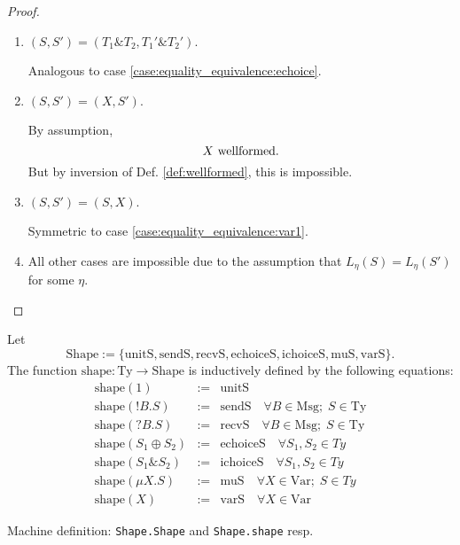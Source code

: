 \documentclass{llncs}
\newcommand*{\Msg}{\mathrm{Msg}}
\newcommand*{\Var}{\mathrm{Var}}
\newcommand*{\Ty}{\mathrm{Ty}}
\newcommand*{\Shape}{\mathrm{Shape}}
\newcommand*{\shape}{\mathrm{shape}}
\newcommand*{\unitS}{\mathrm{unitS}}
\newcommand*{\sendS}{\mathrm{sendS}}
\newcommand*{\recvS}{\mathrm{recvS}}
\newcommand*{\echoiceS}{\mathrm{echoiceS}}
\newcommand*{\ichoiceS}{\mathrm{ichoiceS}}
\newcommand*{\muS}{\mathrm{muS}}
\newcommand*{\varS}{\mathrm{varS}}
\newcommand*{\send}{\mathord{!}}
\newcommand*{\recv}{\mathord{?}}
\newcommand*{\echoice}{\oplus}
\newcommand*{\ichoice}{\mathop{\&}}
\newcommand*{\wf}[1]{\text{$#1$ {\normalfont \rmfamily wellformed}}}
\renewcommand*{\|}{\;|\;}
\newcommand*{\machdef}[1]{Machine definition: #1}
\newcommand*{\code}[1]{\texttt{#1}}
\begin{document}
\begin{proof}
\begin{enumerate}
    \item
      \label{case:equality_equivalence:ichoice}
      $(S, S') = (T_1 \ichoice T_2, T_1' \ichoice T_2')$.

      Analogous to case \ref{case:equality_equivalence:echoice}.

    \item
      \label{case:equality_equivalence:var1}
      $(S, S') = (X, S')$.

      By assumption,
      \begin{equation*}
        \wf{X}.
      \end{equation*}
      But by inversion of Def. \ref{def:wellformed}, this is impossible.

    \item
      \label{case:equality_equivalence:var2}
      $(S, S') = (S, X)$.

      Symmetric to case \ref{case:equality_equivalence:var1}.

    \item
      \label{case:equality_equivalence:other}
      All other cases are impossible due to the assumption that
      $L_\eta(S) = L_\eta(S')$ for some $\eta$.
  \end{enumerate}
\end{proof}


\begin{definition}
  \label{def:shape}
  Let
  \begin{equation*}
    \Shape := \{\unitS, \sendS, \recvS, \echoiceS, \ichoiceS, \muS, \varS \}.
  \end{equation*}
  The function $\shape\colon \Ty \to \Shape$ is inductively defined by the
  following equations:
  \begin{eqnarray*}
    \shape(1) &:=& \unitS \\
    \shape(\send B.S) &:=& \sendS \quad \forall B \in \Msg;\; S \in \Ty \\
    \shape(\recv B.S) &:=& \recvS \quad \forall B \in \Msg;\; S \in \Ty \\
    \shape(S_1 \echoice S_2) &:=& \echoiceS \quad \forall S_1, S_2 \in Ty \\
    \shape(S_1 \ichoice S_2) &:=& \ichoiceS \quad \forall S_1, S_2 \in Ty \\
    \shape(\mu X.S) &:=& \muS \quad \forall X \in \Var;\; S \in Ty \\
    \shape(X) &:=& \varS \quad \forall X \in \Var
  \end{eqnarray*}

  \machdef{\code{Shape.Shape} and \code{Shape.shape} resp.}
\end{definition}
\end{document}
